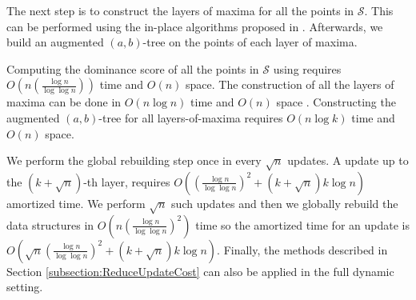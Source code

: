 \documentclass{llncs}
\begin{document}
The next step is to construct the layers of maxima for all the points in $\mathcal{S}$. This can be performed using the in-place algorithms proposed in \cite{BlunckVAlgorithmica10}. Afterwards, we build an augmented $(a,b)$-tree on the points of each layer of maxima.

Computing the dominance score of all the points in $\mathcal{S}$ using \cite{HeMunroWADS11} requires $O(n(\frac{\log n}{\log\log n}))$ time and $O(n)$ space. The construction of all the layers of maxima can be done in $O(n\log n)$ time and $O(n)$ space \cite{BlunckVAlgorithmica10}. Constructing the augmented $(a,b)$-tree for all layers-of-maxima requires $O(n\log k)$ time and $O(n)$ space.

We perform the global rebuilding step once in every $\sqrt{n}$ updates. A update up to the $(k+\sqrt{n})$-th layer, requires $O((\frac{\log n}{\log\log n})^{2}+(k+\sqrt{n})k\log n)$ amortized time. We perform $\sqrt{n}$ such updates and then we globally rebuild the data structures in $O(n(\frac{\log n}{\log\log n})^{2})$ time so the amortized time for an update is $O(\sqrt{n}(\frac{\log n}{\log\log n})^{2}+(k+\sqrt{n})k\log n)$. Finally, the methods described in Section \ref{subsection:ReduceUpdateCost} can also be applied in the full dynamic setting.
\end{document}
